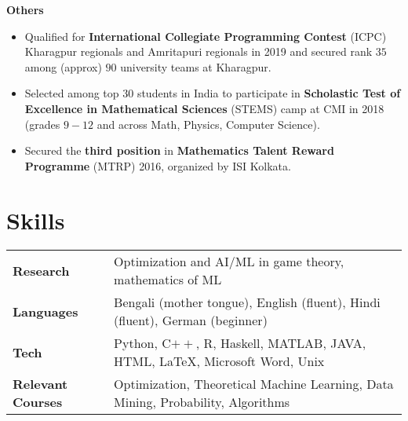 \vspace{\mygap}
\resumeProjectHeading
{\textbf{Others}}
{}
{
\item 
\begin{itemize}[itemsep=-4pt, parsep=5pt, leftmargin=0.5cm]
\item {}  Qualified for \textbf{International Collegiate Programming Contest} (ICPC) Kharagpur regionals and Amritapuri regionals in 2019 and secured rank $35$ among (approx) $90$ university teams at Kharagpur.
\item Selected among top $30$ students in India to participate in \textbf{Scholastic Test of Excellence in Mathematical Sciences} (STEMS) camp at CMI in 2018 (grades $9-12$ and across Math, Physics, Computer Science).
\item Secured the \textbf{third position} in \textbf{Mathematics Talent Reward Programme} (MTRP) 2016, organized by ISI Kolkata.\end{itemize}}
\resumeSubHeadingListEnd
\vspace{\mygap}


\section{Skills}
\vspace{-2pt}
\begin{tabular*}{\textwidth}{l @{\hskip 0.5in} l}
\textbf{Research} & Optimization and AI/ML in game theory, mathematics of ML\\
\textbf{Languages} & Bengali (mother tongue), English (fluent), Hindi (fluent), German (beginner)\\
\textbf{Tech}  & {Python, C$++$, R, Haskell,  MATLAB, JAVA, HTML, \LaTeX, Microsoft Word, Unix} \\
\textbf{Relevant Courses}
  & {Optimization, Theoretical Machine Learning, Data Mining, Probability, Algorithms} \\
\end{tabular*}
\vspace{-15pt}








